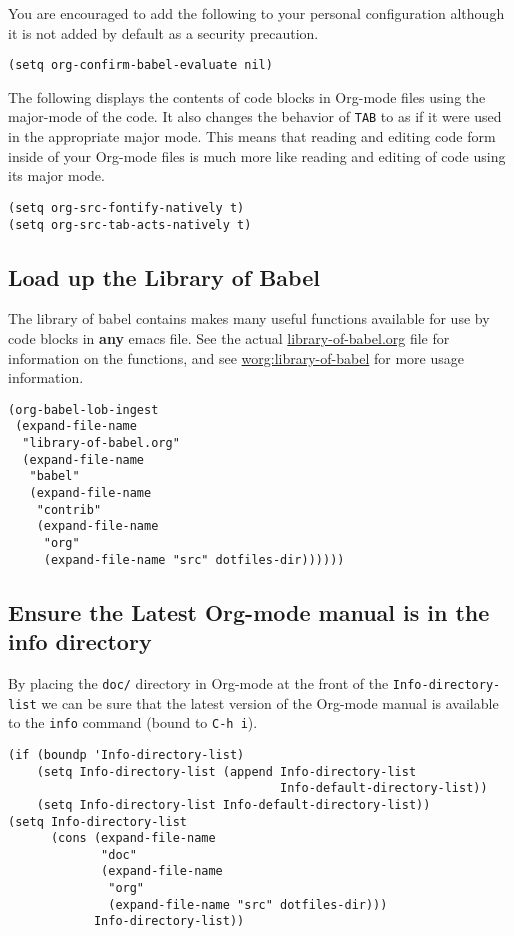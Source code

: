 \documentclass[11pt]{article}
\begin{document}
You are encouraged to add the following to your personal configuration
although it is not added by default as a security precaution.
\begin{verbatim}
(setq org-confirm-babel-evaluate nil)
\end{verbatim}

The following displays the contents of code blocks in Org-mode files
using the major-mode of the code.  It also changes the behavior of
\texttt{TAB} to as if it were used in the appropriate major mode.  This means
that reading and editing code form inside of your Org-mode files is
much more like reading and editing of code using its major mode.
\begin{verbatim}
(setq org-src-fontify-natively t)
(setq org-src-tab-acts-natively t)
\end{verbatim}
\subsection*{Load up the Library of Babel}
\label{sec-1_7}

The library of babel contains makes many useful functions available
for use by code blocks in \textbf{any} emacs file.  See the actual
\href{file:///Users/FingerMan/.emacs.d/src/org/contrib/babel/library-of-babel.org}{library-of-babel.org} file for information on the functions, and see
\href{http://orgmode.org/worg/org-contrib/babel/intro.php#library-of-babel}{worg:library-of-babel} for more usage information.
\begin{verbatim}
(org-babel-lob-ingest
 (expand-file-name
  "library-of-babel.org"
  (expand-file-name
   "babel"
   (expand-file-name
    "contrib"
    (expand-file-name
     "org"
     (expand-file-name "src" dotfiles-dir))))))
\end{verbatim}
\subsection*{Ensure the Latest Org-mode manual is in the info directory}
\label{sec-1_8}

By placing the \texttt{doc/} directory in Org-mode at the front of the
\texttt{Info-directory-list} we can be sure that the latest version of the
Org-mode manual is available to the \texttt{info} command (bound to \texttt{C-h i}).
\begin{verbatim}
(if (boundp 'Info-directory-list)
    (setq Info-directory-list (append Info-directory-list
                                      Info-default-directory-list))
    (setq Info-directory-list Info-default-directory-list))
(setq Info-directory-list
      (cons (expand-file-name
             "doc"
             (expand-file-name
              "org"
              (expand-file-name "src" dotfiles-dir)))
            Info-directory-list))
\end{verbatim}
\end{document}
